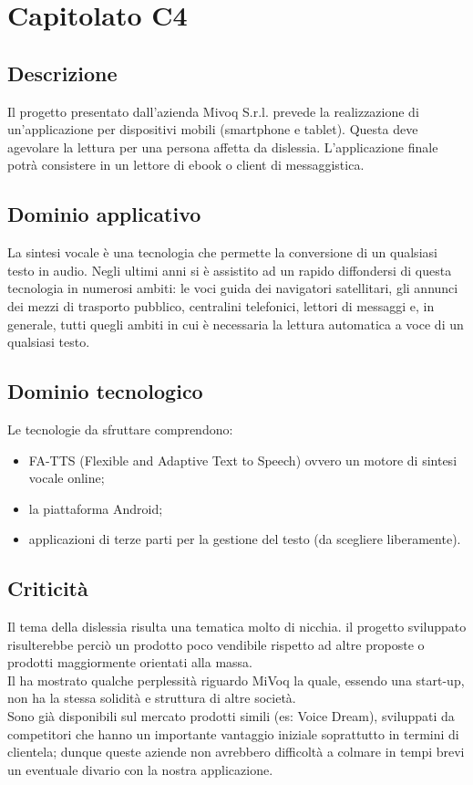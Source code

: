 
\section {Capitolato C4}

\subsection {Descrizione}
Il progetto presentato dall’azienda Mivoq S.r.l. prevede la realizzazione di un’applicazione per dispositivi mobili (smartphone e tablet). Questa deve agevolare la lettura per una persona affetta da dislessia. L’applicazione finale potrà consistere in un lettore di ebook o client di messaggistica.


\subsection {Dominio applicativo}
La sintesi vocale è una tecnologia che permette la conversione di un qualsiasi testo in audio. Negli ultimi anni si è assistito ad un rapido diffondersi di questa tecnologia in numerosi ambiti: le voci guida dei navigatori satellitari, gli annunci dei mezzi di trasporto pubblico, centralini telefonici, lettori di messaggi e, in generale, tutti quegli ambiti in cui è necessaria la lettura automatica a voce di un qualsiasi testo.


\subsection {Dominio tecnologico}
Le tecnologie da sfruttare comprendono:
\begin{itemize}
	\item FA-TTS (Flexible and Adaptive Text to Speech) ovvero un motore di sintesi vocale online;
	\item la piattaforma Android;
	\item applicazioni di terze parti per la gestione del testo (da scegliere liberamente).
\end{itemize}


\subsection {Criticità}
Il tema della dislessia risulta una tematica molto di nicchia. il progetto sviluppato risulterebbe perciò un prodotto poco vendibile rispetto ad altre proposte o prodotti maggiormente orientati alla massa. \\
Il  ha mostrato qualche perplessità riguardo MiVoq la quale, essendo una start-up, non ha la stessa solidità e struttura di altre società. \\
Sono già disponibili sul mercato prodotti simili (es: Voice Dream), sviluppati da competitori che hanno un importante vantaggio iniziale soprattutto in termini di clientela; dunque queste aziende non avrebbero difficoltà a colmare in tempi brevi un eventuale divario con la nostra applicazione.


